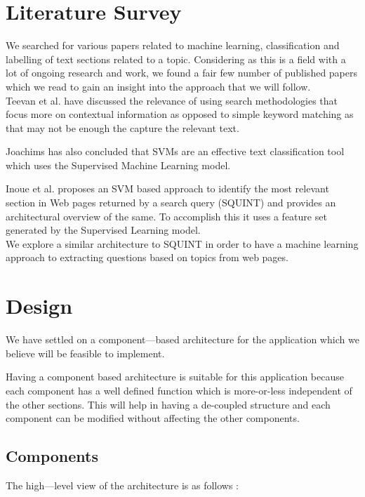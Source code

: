 \chapter{Literature Survey}

We searched for various papers related to machine learning, classification and labelling of text sections related to a topic. Considering as this is a field with a lot of ongoing research and work, we found a fair few number of published papers which we read to gain an insight into the approach that we will follow.\\

Teevan et al.\cite{teevan} have discussed the relevance of using search methodologies that focus more on contextual information as opposed to simple keyword matching as that may not be enough the capture the relevant text. 

Joachims has also concluded\cite{joachims} that SVMs are an effective text classification tool which uses the Supervised Machine Learning model. 

Inoue et al.\cite{squint} proposes an SVM based approach to identify the most relevant section in Web pages returned by a search query (SQUINT) and provides an architectural overview of the same. To accomplish this it uses a feature set generated by the Supervised Learning model. \\

We explore a similar architecture to SQUINT in order to have a machine learning approach to extracting questions based on topics from web pages.

\chapter{Design}

We have settled on a component---based architecture for the application which we believe will be feasible to implement. 

Having a component based architecture is suitable for this application because each component has a well defined function which is more-or-less independent of the other sections. 
This will help in having a de-coupled structure and each component can be modified without affecting the other components. 

\section{Components}

The high---level view of the architecture is as follows : 

